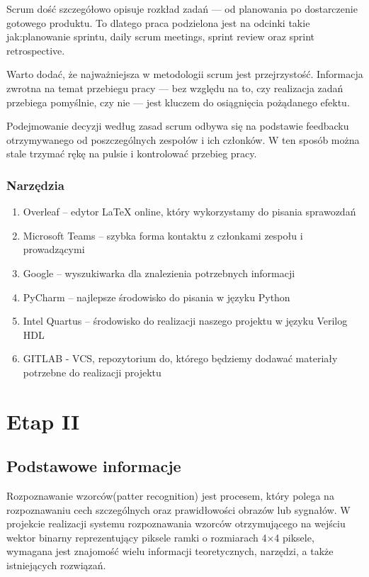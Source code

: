 \documentclass[a4paper, titleauthor]{mwart}
\begin{document}
Scrum  dość szczegółowo opisuje rozkład zadań — od planowania po dostarczenie gotowego produktu. To dlatego praca podzielona jest na odcinki takie jak:planowanie sprintu, daily scrum meetings, sprint review oraz sprint retrospective. 

Warto dodać, że najważniejsza w metodologii scrum jest przejrzystość. Informacja zwrotna na temat przebiegu pracy — bez względu na to, czy realizacja zadań przebiega pomyślnie, czy nie — jest kluczem do osiągnięcia pożądanego efektu. 

Podejmowanie decyzji według zasad scrum odbywa się na podstawie feedbacku otrzymywanego od poszczególnych zespołów i ich członków. W ten sposób można stale trzymać rękę na pulsie i kontrolować przebieg pracy.

\subsubsection{Narzędzia}
\label{sec:narzędzia}
\begin{enumerate}\setlength{\itemsep}{0.2\baselineskip} 
	\item Overleaf – edytor LaTeX online, który wykorzystamy do pisania sprawozdań 
	\item Microsoft Teams – szybka forma kontaktu z członkami zespołu i prowadzącymi 
	\item Google – wyszukiwarka dla znalezienia potrzebnych informacji
	\item PyCharm – najlepsze środowisko do pisania w języku Python 
	\item Intel Quartus – środowisko do realizacji naszego projektu w języku Verilog HDL
        \item GITLAB - VCS, repozytorium do, którego będziemy dodawać materiały potrzebne do realizacji projektu
\end{enumerate}
\newpage

\section{\large Etap II}

\subsection{Podstawowe informacje}
Rozpoznawanie wzorców(patter recognition) jest procesem, który polega na rozpoznawaniu cech szczególnych oraz prawidłowości obrazów lub sygnałów.
W projekcie realizacji systemu rozpoznawania wzorców otrzymującego na wejściu wektor binarny reprezentujący piksele ramki o rozmiarach 4×4 piksele, wymagana jest znajomość wielu informacji teoretycznych, narzędzi, a także istniejących rozwiązań.
\end{document}
